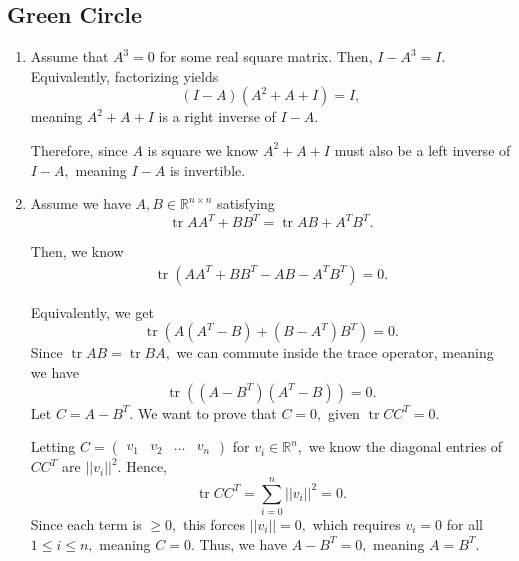 \documentclass[12pt]{article}
\DeclareMathOperator{\tr}{tr} %
\begin{document}
\subsection{Green Circle}
\begin{enumerate}
  \item Assume that $A^3 = 0$ for some real square matrix. Then, $I -
    A^3 = I.$ Equivalently, factorizing yields
    $$
    (I - A)(A^2 + A + I) = I,
    $$
    meaning $A^2 + A + I$ is a right inverse of $I - A.$

    Therefore, since $A$ is square we know $A^2 + A + I$ must also be
    a left inverse of $I - A,$ meaning $I - A$ is invertible.

  \item[4] Assume we have $A, B \in \mathbb R^{n \times n}$ satisfying $$
    \tr{A A^T + B B^T} = \tr{AB + A^T B^T}.
    $$

    Then, we know
    \begin{align*}
      \tr({A A^T + B B^T - AB - A^T B^T})  = 0.
    \end{align*}

    Equivalently, we get
    $$
    \tr({A(A^T - B) + (B - A^T)B^T}) = 0.
    $$
    Since $\tr AB = \tr BA,$ we can commute inside the trace
    operator, meaning we have
    $$
    \tr((A - B^T)(A^T - B)) = 0.
    $$
    Let $C = A- B^T.$ We want to prove that $C = 0,$ given $\tr C C^T = 0.$

    Letting $C =
    \begin{pmatrix}
      v_1 & v_2 & \ldots & v_n
    \end{pmatrix}$
    for $v_i \in \mathbb R^{n},$ we know the diagonal entries of $C
    C^T$ are $||v_i||^2.$ Hence, $$\tr C C^T = \sum_{i = 0}^{n} ||v_i||^2 = 0.$$
    Since each term is $\geq 0,$ this forces $||v_i|| = 0,$ which
    requires $v_i = 0$ for all $1 \leq i \leq n,$ meaning $C = 0.$
    Thus, we have $A - B^T = 0,$ meaning $A = B^T.$


\end{enumerate}
\end{document}
